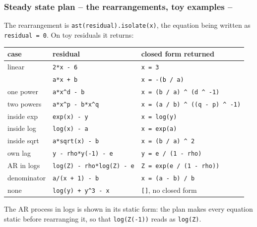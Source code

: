 \documentclass[10pt,slidestop]{beamer}
\theoremstyle{plain}
\begin{document}
\begin{frame}[fragile]
  \frametitle{Steady state plan -- the rearrangements, toy examples --}

  The rearrangement is \verb+ast(residual).isolate(x)+, the equation being written
  as \verb+residual = 0+. On toy residuals it returns:

  \medskip
  \begin{center}\footnotesize
  \begin{tabular}{lll}
    \hline
    case & residual & closed form returned \\
    \hline
    linear & \verb!2*x - 6! & \verb!x = 3! \\
           & \verb!a*x + b! & \verb!x = -(b / a)! \\
    one power & \verb!a*x^d - b! & \verb!x = (b / a) ^ (d ^ -1)! \\
    two powers & \verb!a*x^p - b*x^q! & \verb!x = (a / b) ^ ((q - p) ^ -1)! \\
    inside exp & \verb!exp(x) - y! & \verb!x = log(y)! \\
    inside log & \verb!log(x) - a! & \verb!x = exp(a)! \\
    inside sqrt & \verb!a*sqrt(x) - b! & \verb!x = (b / a) ^ 2! \\
    own lag & \verb!y - rho*y(-1) - e! & \verb!y = e / (1 - rho)! \\
    AR in logs & \verb!log(Z) - rho*log(Z) - e! & \verb!Z = exp(e / (1 - rho))! \\
    denominator & \verb!a/(x + 1) - b! & \verb!x = (a - b) / b! \\
    none & \verb!log(y) + y^3 - x! & \verb![]!, no closed form \\
    \hline
  \end{tabular}
  \end{center}

  \medskip
  \small The AR process in logs is shown in its static form: the plan makes every
  equation static before rearranging it, so that \verb+log(Z(-1))+ reads as
  \verb+log(Z)+.

\end{frame}
\end{document}
